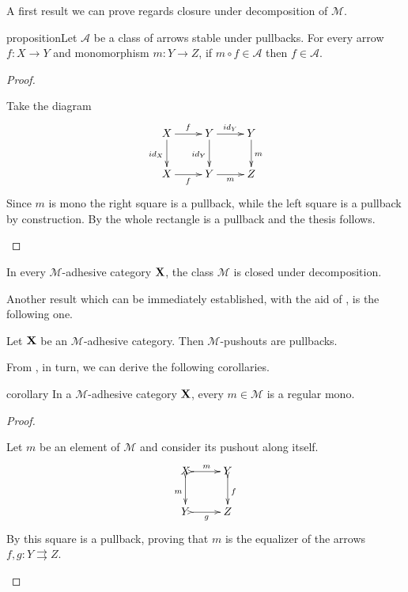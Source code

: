 \documentclass[a4paper,UKenglish,cleveref,pdftex, thm-restate,numberwithinsect]{lipics}
\newcommand{\id}[1]{\mathsf{id}_{#1}}
\def\X{\textbf {\textup{X}}}
\def\Y{\textbf {\textup{Y}}}
\begin{document}
A first result we can prove regards closure under decomposition of $\mathcal{M}$.

\begin{theoremEnd}[category=sec2]{proposition}\label{prop:deco}Let  $\mathcal{A}$ be a class of arrows stable under pullbacks. For every arrow $f\colon X\to Y$ and monomorphism $m\colon Y\to Z$, if $m\circ f \in\mathcal{A}$ then $f\in \mathcal{A}$.
\end{theoremEnd}
\begin{proof}\begin{proofEnd}
	Take the diagram
	\[\xymatrix{X \ar[d]_{\id{X}}\ar[r]^{f}& Y \ar[r]^{\id{Y}}  \ar[d]_{\id{Y}}& Y \ar[d]^{m}\\
		X \ar[r]_{f}& Y \ar[r]_{m} & Z}\]
	Since $m$ is mono the right square is a pullback, while the left square is a pullback by construction. By  the whole rectangle is a pullback and the thesis follows.
	\end{proofEnd}
\end{proof}
\begin{corollary}\label{cor:deco}
	In every $\mathcal{M}$-adhesive category $\X$, the class $\mathcal{M}$ is closed under decomposition.
\end{corollary}

Another result which can be immediately established, with the aid of , is the following one.
\begin{proposition}\label{prop:pbpoad}
	Let $\X$ be an $\mathcal{M}$-adhesive category. Then $\mathcal{M}$-pushouts are pullbacks.
\end{proposition}

From , in turn, we can derive the following corollaries.
\begin{theoremEnd}[category=sec2]{corollary}\label{cor:rego}
	In a $\mathcal{M}$-adhesive category $\X$, every $m\in\mathcal{M}$ is a regular mono.
\end{theoremEnd}
\begin{proof}\begin{proofEnd}
		Let $m$ be an element of $\mathcal{M}$ and consider its pushout along itself.
		\[\xymatrix{X\ar@{>->}[r]^m \ar@{>->}[d]_m& Y\ar@{>->}[d]^{f}\\Y \ar@{>->}[r]_g & Z}\]
		By  this square is a pullback, proving that $m$ is the equalizer of the arrows $f,g\colon Y\rightrightarrows Z$. 
	\end{proofEnd} 
\end{proof}
\end{document}
